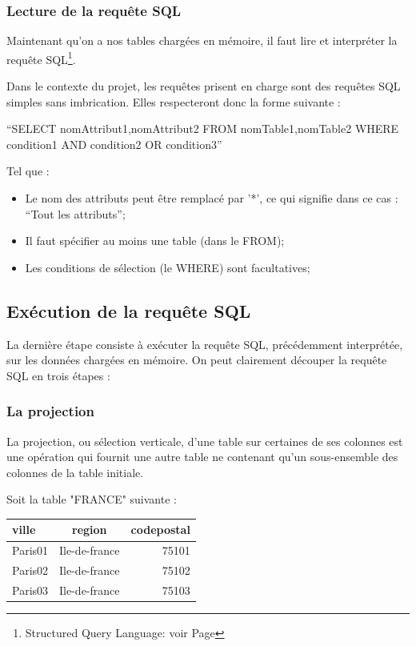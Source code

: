 \documentclass[oneside,13pt,a4paper]{report}
\begin{document}
\subsubsection{Lecture de la requête SQL}

Maintenant qu'on a nos tables chargées en mémoire, il faut lire et interpréter la requête SQL\footnote{Structured Query Language: voir Page \pageref{sql}}.

Dans le contexte du projet, les requêtes prisent en charge sont des requêtes SQL simples sans imbrication. Elles respecteront donc la forme suivante :

\enquote{SELECT nomAttribut1,nomAttribut2 FROM nomTable1,nomTable2 WHERE condition1 AND condition2 OR condition3}

Tel que :
\begin{itemize}
	\item Le nom des attributs peut être remplacé par '*', ce qui signifie dans ce cas : \enquote{Tout les attributs};
	\item Il faut spécifier au moins une table (dans le FROM);
	\item Les conditions de sélection (le WHERE) sont facultatives;
\end{itemize}
\vspace{0.3cm}


\subsection{Exécution de la requête SQL}

La dernière étape consiste à exécuter la requête SQL, précédemment interprétée, sur les données chargées en mémoire. On peut clairement découper la requête SQL en trois étapes :

\subsubsection{La projection}

La projection, ou sélection verticale, d'une table sur certaines de ses colonnes est une opération qui fournit une autre table ne contenant qu'un sous-ensemble des colonnes de la table initiale.

Soit la table "FRANCE" suivante :

\begin{tabular}{|l|c|r|}
	\hline
	ville   & region        & codepostal
	\\
	\hline
	Paris01 & Ile-de-france & 75101      \\
	Paris02 & Ile-de-france & 75102      \\
	Paris03 & Ile-de-france & 75103      \\
	\hline
\end{tabular}
\end{document}
